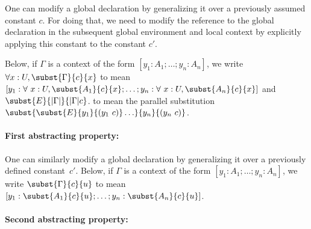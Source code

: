 One can modify a global declaration by generalizing it over a
previously assumed constant $c$. For doing that, we need to modify the
reference to the global declaration in the subsequent global
environment and local context by explicitly applying this constant to
the constant $c'$.

Below, if $\Gamma$ is a context of the form
$[y_1:A_1;\ldots;y_n:A_n]$, we write $\forall
x:U,\subst{\Gamma}{c}{x}$ to mean
$[y_1:\forall~x:U,\subst{A_1}{c}{x};\ldots;y_n:\forall~x:U,\subst{A_n}{c}{x}]$
and
$\subst{E}{|\Gamma|}{|\Gamma|c}$.
to mean the parallel substitution
$\subst{\subst{E}{y_1}{(y_1~c)}\ldots}{y_n}{(y_n~c)}$.

\paragraph{First abstracting property:}



One can similarly modify a global declaration by generalizing it over
a previously defined constant~$c'$.  Below, if $\Gamma$ is a context
of the form $[y_1:A_1;\ldots;y_n:A_n]$, we write $
\subst{\Gamma}{c}{u}$ to mean
$[y_1:\subst{A_1}{c}{u};\ldots;y_n:\subst{A_n}{c}{u}]$.

\paragraph{Second abstracting property:}


